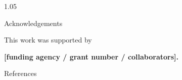 \documentclass[final]{beamer}
\newlength{\sepwidth}
\newlength{\colwidth}
\newcommand{\separatorcolumn}{%
    \begin{column}{\sepwidth}
    \end{column}
}
\begin{document}
\begin{frame}[t]
\begin{columns}[t]
\begin{column}{1.05\colwidth}






\begin{block}{Acknowledgements}

This work was supported by

\textbf{
    [funding agency / grant number / collaborators].
}

\end{block}



\begin{block}{References}

%

\end{block}


\end{column}



\separatorcolumn

\end{columns}

\end{frame}
\end{document}
